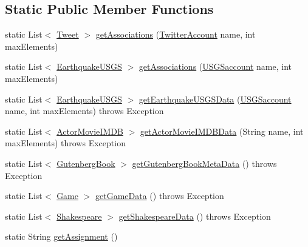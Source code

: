 \subsection*{Static Public Member Functions}
\begin{DoxyCompactItemize}
\item 
static List$<$ \hyperlink{classbridges_1_1data__src__dependent_1_1_tweet}{Tweet} $>$ \hyperlink{classbridges_1_1connect_1_1_bridges_ad8f145f95222730fad3c0628b42f0128}{get\+Associations} (\hyperlink{classbridges_1_1data__src__dependent_1_1_twitter_account}{Twitter\+Account} name, int max\+Elements)
\item 
static List$<$ \hyperlink{classbridges_1_1data__src__dependent_1_1_earthquake_u_s_g_s}{Earthquake\+U\+S\+G\+S} $>$ \hyperlink{classbridges_1_1connect_1_1_bridges_ac02211d6205c1270df11fcc271982d40}{get\+Associations} (\hyperlink{classbridges_1_1data__src__dependent_1_1_u_s_g_saccount}{U\+S\+G\+Saccount} name, int max\+Elements)
\item 
static List$<$ \hyperlink{classbridges_1_1data__src__dependent_1_1_earthquake_u_s_g_s}{Earthquake\+U\+S\+G\+S} $>$ \hyperlink{classbridges_1_1connect_1_1_bridges_afd68bf25a3f61e731f603da67fbdcecc}{get\+Earthquake\+U\+S\+G\+S\+Data} (\hyperlink{classbridges_1_1data__src__dependent_1_1_u_s_g_saccount}{U\+S\+G\+Saccount} name, int max\+Elements)  throws Exception 
\item 
static List$<$ \hyperlink{classbridges_1_1data__src__dependent_1_1_actor_movie_i_m_d_b}{Actor\+Movie\+I\+M\+D\+B} $>$ \hyperlink{classbridges_1_1connect_1_1_bridges_a30338703da622d677b9ac4f83f8d4200}{get\+Actor\+Movie\+I\+M\+D\+B\+Data} (String name, int max\+Elements)  throws Exception 
\item 
static List$<$ \hyperlink{classbridges_1_1data__src__dependent_1_1_gutenberg_book}{Gutenberg\+Book} $>$ \hyperlink{classbridges_1_1connect_1_1_bridges_a123d445316be7e9927b5642a3b8c71ba}{get\+Gutenberg\+Book\+Meta\+Data} ()  throws Exception
\item 
static List$<$ \hyperlink{classbridges_1_1data__src__dependent_1_1_game}{Game} $>$ \hyperlink{classbridges_1_1connect_1_1_bridges_abcd1c3465d8963cd635a63e248f33525}{get\+Game\+Data} ()  throws Exception 
\item 
static List$<$ \hyperlink{classbridges_1_1data__src__dependent_1_1_shakespeare}{Shakespeare} $>$ \hyperlink{classbridges_1_1connect_1_1_bridges_a03ba87a09742cfb40f357253239006e6}{get\+Shakespeare\+Data} ()  throws Exception 
\item 
static String \hyperlink{classbridges_1_1connect_1_1_bridges_ae488b9bf0d696adb7f5a6ba7ce4ff2fd}{get\+Assignment} ()

\end{DoxyCompactItemize}

